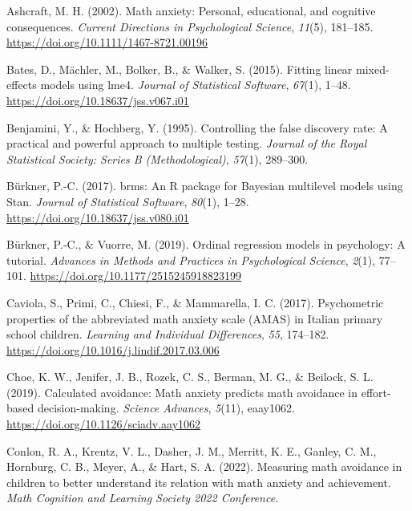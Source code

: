 \documentclass[
  man,
  floatsintext,
  longtable,
  nolmodern,
  notxfonts,
  notimes,
  colorlinks=true,linkcolor=blue,citecolor=blue,urlcolor=blue]{apa7}
\newlength{\cslhangindent}
\newenvironment{CSLReferences}[2] %
 {\begin{list}{}{%
  \setlength{\itemindent}{0pt}
  \setlength{\leftmargin}{0pt}
  \setlength{\parsep}{0pt}
  \ifodd #1
   \setlength{\leftmargin}{\cslhangindent}
   \setlength{\itemindent}{-1\cslhangindent}
  \fi
  \setlength{\itemsep}{#2\baselineskip}}}
 {\end{list}}
\begin{document}
\label{refs}
\begin{CSLReferences}{1}{0}
Ashcraft, M. H. (2002). Math anxiety: Personal, educational, and
cognitive consequences. \emph{Current Directions in Psychological
Science}, \emph{11}(5), 181--185.
\url{https://doi.org/10.1111/1467-8721.00196}

Bates, D., Mächler, M., Bolker, B., \& Walker, S. (2015). Fitting linear
mixed-effects models using {lme4}. \emph{Journal of Statistical
Software}, \emph{67}(1), 1--48.
\url{https://doi.org/10.18637/jss.v067.i01}

Benjamini, Y., \& Hochberg, Y. (1995). Controlling the false discovery
rate: A practical and powerful approach to multiple testing.
\emph{Journal of the Royal Statistical Society: Series B
(Methodological)}, \emph{57}(1), 289--300.

Bürkner, P.-C. (2017). {brms}: An {R} package for {Bayesian} multilevel
models using {Stan}. \emph{Journal of Statistical Software},
\emph{80}(1), 1--28. \url{https://doi.org/10.18637/jss.v080.i01}

Bürkner, P.-C., \& Vuorre, M. (2019). Ordinal regression models in
psychology: A tutorial. \emph{Advances in Methods and Practices in
Psychological Science}, \emph{2}(1), 77--101.
\url{https://doi.org/10.1177/2515245918823199}

Caviola, S., Primi, C., Chiesi, F., \& Mammarella, I. C. (2017).
Psychometric properties of the abbreviated math anxiety scale ({AMAS})
in {Italian} primary school children. \emph{Learning and Individual
Differences}, \emph{55}, 174--182.
\url{https://doi.org/10.1016/j.lindif.2017.03.006}

Choe, K. W., Jenifer, J. B., Rozek, C. S., Berman, M. G., \& Beilock, S.
L. (2019). Calculated avoidance: Math anxiety predicts math avoidance in
effort-based decision-making. \emph{Science Advances}, \emph{5}(11),
eaay1062. \url{https://doi.org/10.1126/sciadv.aay1062}

Conlon, R. A., Krentz, V. L., Dasher, J. M., Merritt, K. E., Ganley, C.
M., Hornburg, C. B., Meyer, A., \& Hart, S. A. (2022). Measuring math
avoidance in children to better understand its relation with math
anxiety and achievement. \emph{Math Cognition and Learning Society 2022
Conference}.


\end{CSLReferences}
\end{document}
